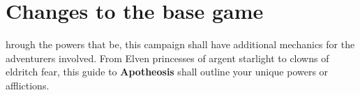 \chapter{Changes to the base game}

hrough the powers that be, this campaign shall have additional mechanics for the adventurers involved. From Elven princesses of argent starlight to clowns of eldritch fear, this guide to \textbf{Apotheosis} shall outline your unique powers or afflictions.
